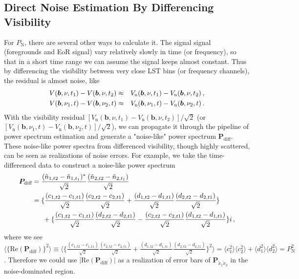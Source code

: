 \documentclass[12pt,a4paper]{article}
\begin{document}
\subsection{Direct Noise Estimation By Differencing Visibility}
\label{subsubsec:diff}
For $P_\text{N}$, there are several other ways to calculate it. The signal signal (foregrounds and EoR signal) vary relatively slowly in time (or frequency), so that in a short time range we can assume the signal keeps almost constant. Thus by differencing the visibility between very close LST bins (or frequency channels), the residual is almost noise, like
\begin{eqnarray}
    V(\bm{b},\nu,t_1) -  V(\bm{b},\nu,t_2) & \approx & V_\text{n}(\bm{b},\nu,t_1) -  V_\text{n}(\bm{b},\nu,t_2) \,, \notag \\
    V(\bm{b},\nu_1,t) -  V(\bm{b},\nu_2,t) & \approx & V_\text{n}(\bm{b},\nu_1, t) -  V_\text{n}(\bm{b},\nu_2, t) \,.\notag \\
\end{eqnarray}
With the visibility residual $[V_\text{n}(\bm{b},\nu,t_1) -  V_\text{n}(\bm{b},\nu,t_2)]/\sqrt{2}$ (or $[V_\text{n}(\bm{b},\nu_1, t) -  V_\text{n}(\bm{b},\nu_2, t)]/\sqrt{2}$), we can propagate it through the pipeline of power spectrum estimation and generate a "noise-like" power spectrum $\bm{P}_\text{diff}$. These noise-like power spectra from differenced visibility, though highly scattered, can be seen as realizations of noise errors. For example, we take the time-differenced data to construct a noise-like power spectrum
\begin{align}
\label{eq:pnn}
    \bm{P}_\text{diff} & =\frac{(\tilde{n}_{1,t2} - \tilde{n}_{1,t_1})^*}{\sqrt{2}}\frac{(\tilde{n}_{2,t2} - \tilde{n}_{2,t_1})}{\sqrt{2}} \notag \\
    & = \{\frac{(c_{1,t2}-c_{1,t1})}{\sqrt{2}}\frac{(c_{2,t2}-c_{2,t1})}{\sqrt{2}} + \frac{(d_{1,t2}-d_{1,t1})}{\sqrt{2}}\frac{(d_{2,t2}-d_{2,t1})}{\sqrt{2}}\} \notag \\
    & \phantom{==} + \{\frac{(c_{1,t2}-c_{1,t1})}{\sqrt{2}}\frac{(d_{2,t2}-d_{2,t1})}{\sqrt{2}}-\frac{(c_{2,t2}-c_{2,t1})}{\sqrt{2}}\frac{(d_{1,t2}-d_{1,t1})}{\sqrt{2}}\}i \,,
\end{align}
where we see $\langle\{\text{Re}(\bm{P}_\text{diff})\}^2 \rangle \equiv \langle \{\frac{(c_{1,t2}-c_{1,t1})}{\sqrt{2}}\frac{(c_{2,t2}-c_{2,t1})}{\sqrt{2}} + \frac{(d_{1,t2}-d_{1,t1})}{\sqrt{2}}\frac{(d_{2,t2}-d_{2,t1})}{\sqrt{2}}\}^2 \rangle = \langle c_1^2\rangle\langle c_2^2\rangle + \langle d_1^2\rangle\langle d_2^2\rangle = P_\text{N}^2$. Therefore we could use $|\text{Re}(\bm{P}_\text{diff})|$ as a realization of error bars of $\bm{P}_{\tilde{x}_1\tilde{x}_2}$ in the noise-dominated region.
\end{document}
